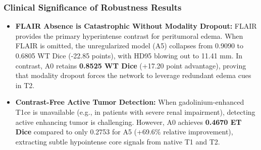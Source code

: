 \documentclass[12pt, a4paper]{article}
\begin{document}
\begin{table}[H]
\centering
\caption{Robustness Evaluation Under Missing MRI Sequences (A0 vs. A5)}
\label{tab:missing_modalities}
\vspace{0.2cm}
\end{table}

\subsubsection{Clinical Significance of Robustness Results}
\begin{itemize}[leftmargin=*, itemsep=4pt]
    \item \textbf{FLAIR Absence is Catastrophic Without Modality Dropout:} FLAIR provides the primary hyperintense contrast for peritumoral edema. When FLAIR is omitted, the unregularized model (A5) collapses from 0.9090 to 0.6805 WT Dice (-22.85 points), with HD95 blowing out to 11.41 mm. In contrast, A0 retains \textbf{0.8525 WT Dice} (+17.20 point advantage), proving that modality dropout forces the network to leverage redundant edema cues in T2.
    \item \textbf{Contrast-Free Active Tumor Detection:} When gadolinium-enhanced T1ce is unavailable (e.g., in patients with severe renal impairment), detecting active enhancing tumor is challenging. However, A0 achieves \textbf{0.4670 ET Dice} compared to only 0.2753 for A5 (+69.6\% relative improvement), extracting subtle hypointense core signals from native T1 and T2.
\end{itemize}
\end{document}
